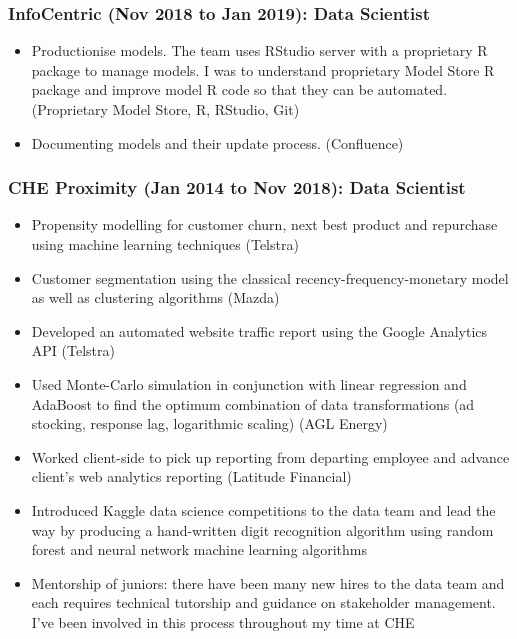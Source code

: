 \documentclass{article}
\begin{document}
\subsubsection{InfoCentric (Nov 2018 to Jan 2019): Data Scientist}
\begin{itemize}
    \item Productionise models. The team uses RStudio server with a proprietary R package to manage models. I was to understand proprietary Model Store R package and improve model R code so that they can be automated. (Proprietary Model Store, R, RStudio, Git)
    \item Documenting models and their update process. (Confluence)
\end{itemize}

\subsubsection{CHE Proximity (Jan 2014 to Nov 2018): Data Scientist}

\begin{itemize}
    \item Propensity modelling for customer churn, next best product and repurchase using machine learning techniques (Telstra)
    \item Customer segmentation using the classical recency-frequency-monetary model as well as clustering algorithms (Mazda)
    \item Developed an automated website traffic report using the Google Analytics API (Telstra)
    \item Used Monte-Carlo simulation in conjunction with linear regression and AdaBoost to find the optimum combination of data transformations (ad stocking, response lag, logarithmic scaling) (AGL Energy)
    \item Worked client-side to pick up reporting from departing employee and advance client's web analytics reporting (Latitude Financial)
    \item Introduced Kaggle data science competitions to the data team and lead the way by producing a hand-written digit recognition algorithm using random forest and neural network machine learning algorithms
    \item Mentorship of juniors: there have been many new hires to the data team and each requires technical tutorship and guidance on stakeholder management. I've been involved in this process throughout my time at CHE
\end{itemize}
\end{document}
